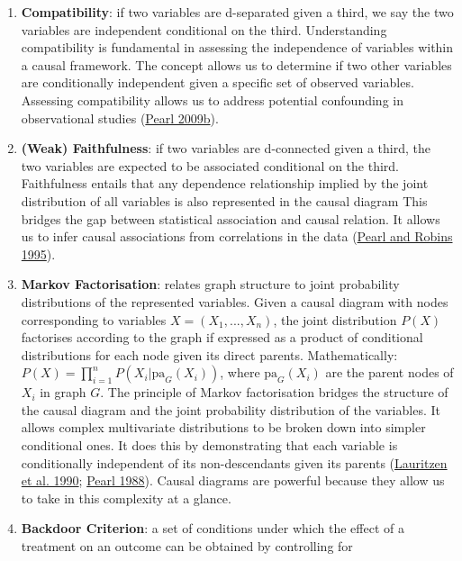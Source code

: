 \documentclass[
  singlecolumn]{article}
\begin{document}
\begin{enumerate}
\def\labelenumi{\arabic{enumi}.}
\setcounter{enumi}{7}
\item
  \textbf{Compatibility}: if two variables are d-separated given a
  third, we say the two variables are independent conditional on the
  third. Understanding compatibility is fundamental in assessing the
  independence of variables within a causal framework. The concept
  allows us to determine if two other variables are conditionally
  independent given a specific set of observed variables. Assessing
  compatibility allows us to address potential confounding in
  observational studies (\protect\hyperlink{ref-pearl2009a}{Pearl
  2009b}).
\item
  \textbf{(Weak) Faithfulness}: if two variables are d-connected given a
  third, the two variables are expected to be associated conditional on
  the third. Faithfulness entails that any dependence relationship
  implied by the joint distribution of all variables is also represented
  in the causal diagram This bridges the gap between statistical
  association and causal relation. It allows us to infer causal
  associations from correlations in the data
  (\protect\hyperlink{ref-pearl1995a}{Pearl and Robins 1995}).
\item
  \textbf{Markov Factorisation}: relates graph structure to joint
  probability distributions of the represented variables. Given a causal
  diagram with nodes corresponding to variables \(X = (X_1, ..., X_n)\),
  the joint distribution \(P(X)\) factorises according to the graph if
  expressed as a product of conditional distributions for each node
  given its direct parents. Mathematically:
  \(P(X) = \prod_{i=1}^{n} P(X_i | \text{pa}_G(X_i))\), where
  \(\text{pa}_G(X_i)\) are the parent nodes of \(X_i\) in graph \(G\).
  The principle of Markov factorisation bridges the structure of the
  causal diagram and the joint probability distribution of the
  variables. It allows complex multivariate distributions to be broken
  down into simpler conditional ones. It does this by demonstrating that
  each variable is conditionally independent of its non-descendants
  given its parents (\protect\hyperlink{ref-lauritzen1990}{Lauritzen et
  al. 1990}; \protect\hyperlink{ref-pearl1988}{Pearl 1988}). Causal
  diagrams are powerful because they allow us to take in this complexity
  at a glance.
\item
  \textbf{Backdoor Criterion}: a set of conditions under which the
  effect of a treatment on an outcome can be obtained by controlling for

\end{enumerate}
\end{document}
